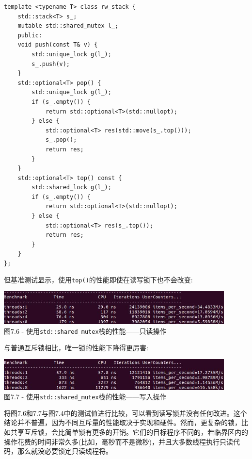 \begin{lstlisting}[style=styleCXX]
template <typename T> class rw_stack {
	std::stack<T> s_;
	mutable std::shared_mutex l_;
	public:
	void push(const T& v) {
		std::unique_lock g(l_);
		s_.push(v);
	}
	std::optional<T> pop() {
		std::unique_lock g(l_);
		if (s_.empty()) {
			return std::optional<T>(std::nullopt);
		} else {
			std::optional<T> res(std::move(s_.top()));
			s_.pop();
			return res;
		}
	}
	std::optional<T> top() const {
		std::shared_lock g(l_);
		if (s_.empty()) {
			return std::optional<T>(std::nullopt);
		} else {
			std::optional<T> res(s_.top());
			return res;
		}
	}
};
\end{lstlisting}

但基准测试显示，使用\texttt{top()}的性能即使在读写锁下也不会改变:

\begin{center}
\includegraphics[width=0.9\textwidth]{content/2/chapter7/images/6.jpg}\\
图7.6 - 使用\texttt{std::shared\_mutex}栈的性能——只读操作
\end{center}

与普通互斥锁相比，唯一锁的性能下降得更厉害:

\begin{center}
\includegraphics[width=0.9\textwidth]{content/2/chapter7/images/7.jpg}\\
图7.7 - 使用\texttt{std::shared\_mutex}栈的性能——写入操作
\end{center}

将图7.6和7.7与图7.4中的测试值进行比较，可以看到读写锁并没有任何改进。这个结论并不普遍，因为不同互斥量的性能取决于实现和硬件。然而，更复杂的锁，比如共享互斥锁，会比简单锁有更多的开销。它们的目标程序不同的，若临界区内的操作花费的时间非常久多(比如，毫秒而不是微秒)，并且大多数线程执行只读代码，那么就没必要锁定只读线程将。

